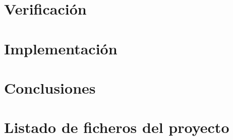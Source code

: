 \documentclass[%
    school=etsisi,%
    type=pfg,%
    degree=61CI,%
]{upm-report}
\begin{document}
\chapter{Verificación}
\label{ch:verificacion}


\chapter{Implementación}
\label{ch:implementacion}


\chapter{Conclusiones}
\label{ch:conclusiones}


\appendix

\chapter{Listado de ficheros del proyecto}
\label{ch:ficheros}
\end{document}
